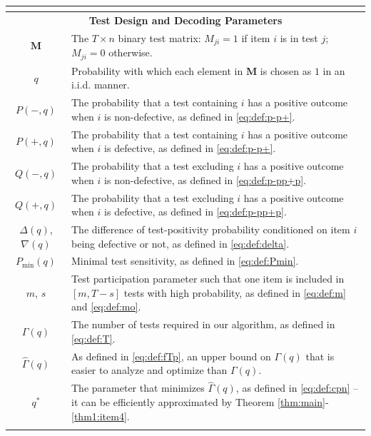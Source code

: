 \documentclass[onecolumn,letterpaper]{IEEEtran}
\newcommand{\cM}{{\boldsymbol{M}}}
\newcommand{\cp}{{q}}
\newcommand{\nt}{{m}}
\newcommand{\mo}{{s}}
\newcommand{\pn}{{P(-,\cp)}}
\newcommand{\pp}{{P(+,\cp)}}
\newcommand{\pmin}{{P_{\min}(\cp)}}
\newcommand{\pgap}{{\Delta(\cp)}}
\newcommand{\cpn}{{\cp^*}}
\newcommand{\pnm}{{Q(-,\cp)}}
\newcommand{\ppm}{{Q(+,\cp)}}
\newcommand{\pgapm}{{\nabla(\cp)}}
\newcommand{\ftau}{{\Gamma}}
\newcommand{\ftaup}{{\hat{\Gamma}}}
\newcommand{\fT}{{\ftau(\cp)}}
\newcommand{\fTp}{\ftaup (\cp)}
\begin{document}
\begin{table}
\begin{tabular}{|c|l|}
        \multicolumn{2}{c}{}
        \\\hline
     \multicolumn{2}{|c|}{{\bf Test Design and Decoding Parameters}}
        \\\hline
        $\cM$ & The $T \times n$ binary test matrix: $M_{ji} = 1$ if item $i$ is in test $j$; $M_{ji} = 0$ otherwise.
        \\\hline
        $\cp$ & Probability with which each element in $\cM$ is chosen as $1$ in an i.i.d. manner.
        \\\hline
        $\pn$ & The probability that a test containing $i$ has a positive outcome when $i$ is non-defective, as defined in \eqref{eq:def:p-p+}.
        \\\hline
        $\pp$ &  The probability that a test containing $i$ has a positive outcome when $i$ is defective, as defined in \eqref{eq:def:p-p+}.
        \\\hline
        $\pnm$ & The probability that a test excluding $i$ has a positive outcome when $i$ is non-defective, as defined in \eqref{eq:def:p-pp+p}.
        \\\hline
        $\ppm$ & The probability that a test excluding $i$ has a positive outcome when $i$ is defective, as defined in \eqref{eq:def:p-pp+p}.
        \\\hline
        $\pgap$,$\pgapm$ & The difference of test-positivity probability conditioned on item $i$ being defective or not, as defined in \eqref{eq:def:delta}.
        \\\hline
        $\pmin$ & Minimal test sensitivity, as defined in \eqref{eq:def:Pmin}.
        \\\hline
        $\nt$, $\mo$ & Test participation parameter such that one item is included in $[\nt,T-\mo]$ tests with high probability, as defined in \eqref{eq:def:m} and \eqref{eq:def:mo}.
        \\\hline
        $\fT$ & The number of tests required in our algorithm, as defined in \eqref{eq:def:T}.
        \\\hline
        $\fTp$ & As defined in \eqref{eq:def:fTp}, an upper bound on $\fT$ that is easier to analyze and optimize than $\fT$.
        \\\hline
        $\cpn$ & The parameter that minimizes $\fTp$, as defined in \eqref{eq:def:cpn} -- it can be efficiently approximated by Theorem \ref{thm:main}-\ref{thm1:item4}.
        \\\hline
        
        \multicolumn{2}{c}{}
        \\\hline
        

\end{tabular}
\end{table}
\end{document}
